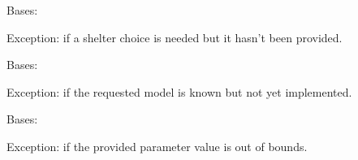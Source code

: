 \documentclass[letterpaper,10pt,english]{sphinxmanual}
\begin{document}

\begin{fulllineitems}
\label{\detokenize{cubmods:cubmods.general.NoShelterError}}
\pysigstartsignatures
{}
\pysigstopsignatures
\sphinxAtStartPar
Bases: 

\sphinxAtStartPar
Exception: if a shelter choice is needed but it hasn’t been provided.

\end{fulllineitems}


\begin{fulllineitems}
\label{\detokenize{cubmods:cubmods.general.NotImplementedModelError}}
\pysigstartsignatures
{}
\pysigstopsignatures
\sphinxAtStartPar
Bases: 

\sphinxAtStartPar
Exception: if the requested model is known but not
yet implemented.

\end{fulllineitems}


\begin{fulllineitems}
\label{\detokenize{cubmods:cubmods.general.ParameterOutOfBoundsError}}
\pysigstartsignatures
{}
\pysigstopsignatures
\sphinxAtStartPar
Bases: 

\sphinxAtStartPar
Exception: if the provided parameter value is out of bounds.

\end{fulllineitems}

\end{document}
